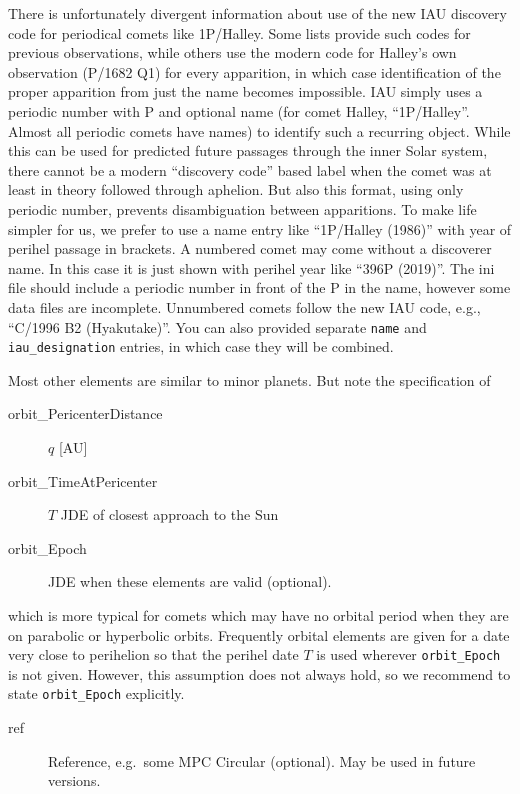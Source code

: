There is unfortunately divergent information about use of the new IAU discovery code for periodical comets like 1P/Halley. 
Some lists provide such codes for previous observations, while others use the modern code for Halley's own observation (P/1682 Q1) for every apparition, 
in which case identification of the proper apparition from just the name becomes impossible. 
IAU simply uses a periodic number with P and optional name (for comet Halley, ``1P/Halley''. Almost all periodic comets have names) to identify such a recurring object. 
While this can be used for predicted future passages through the inner Solar system, 
there cannot be a modern ``discovery code'' based label when the comet was at least in theory followed through aphelion.
But also this format, using only periodic number, prevents disambiguation between apparitions. 
To make life simpler for us, we prefer to use a name entry like ``1P/Halley (1986)'' with year of perihel passage in brackets. 
A numbered comet may come without a discoverer name. In this case it is just shown with perihel year like ``396P (2019)''.
The ini file should include a periodic number in front of the P in the name, however some data files are incomplete. 
Unnumbered comets follow the new IAU code, e.g., ``C/1996 B2 (Hyakutake)''. 
You can also provided separate \texttt{name} and \texttt{iau\_designation} entries, in which case they will be combined. 


Most other elements are similar to minor planets. But note the specification of
\begin{description}
\item[orbit\_PericenterDistance] $q$ [AU]
\item[orbit\_TimeAtPericenter] $T$  JDE of closest approach to the Sun
\item[orbit\_Epoch] JDE when these elements are valid (optional).
\end{description}
which is more typical for comets which may have no orbital period when
they are on parabolic or hyperbolic orbits. Frequently orbital
elements are given for a date very close to perihelion so that the
perihel date $T$ is used wherever 
\texttt{orbit\_Epoch} is not given. However, this assumption does not always hold,
so we recommend to state \texttt{orbit\_Epoch} explicitly.

\begin{description}
\item[ref] Reference, e.g.\ some MPC Circular (optional).  May be used in future versions.
\end{description}


